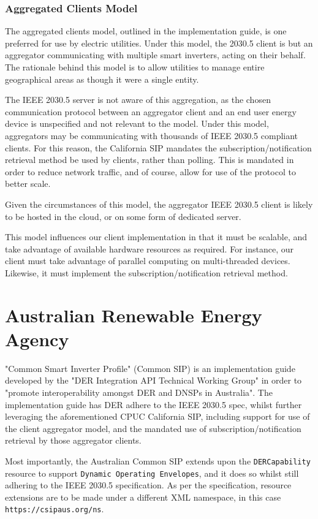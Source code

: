 \subsubsection{Aggregated Clients Model}
The aggregated clients model, outlined in the implementation guide, is one preferred for use by electric utilities. Under this model, the 2030.5 client is but an aggregator communicating with multiple smart inverters, acting on their behalf.
The rationale behind this model is to allow utilities to manage entire geographical areas as though it were a single entity.



The IEEE 2030.5 server is not aware of this aggregation, as the chosen communication protocol between an aggregator client and an end user energy device is unspecified and not relevant to the model.
Under this model, aggregators may be communicating with thousands of IEEE 2030.5 compliant clients. For this reason, the California SIP mandates the subscription/notification retrieval method be used by clients, rather than polling.
This is mandated in order to reduce network traffic, and of course, allow for use of the protocol to better scale.

Given the circumstances of this model, the aggregator IEEE 2030.5 client is likely to be hosted in the cloud, or on some form of dedicated server.

This model influences our client implementation in that it must be scalable, and take advantage of available hardware resources as required. For instance, our client must take advantage of parallel computing on multi-threaded devices.
Likewise, it must implement the subscription/notification retrieval method.


\section{Australian Renewable Energy Agency}
"Common Smart Inverter Profile" (Common SIP) is an implementation guide developed by the "DER Integration API Technical Working Group" in order to "promote interoperability amongst DER and DNSPs in Australia".
The implementation guide has DER adhere to the IEEE 2030.5 spec, whilst further leveraging the aforementioned CPUC California SIP, including support for use of the client aggregator model, and the mandated use of subscription/notification retrieval by those aggregator clients.

Most importantly, the Australian Common SIP extends upon the \texttt{DERCapability} resource to support \texttt{Dynamic Operating Envelopes}, and it does so whilst still adhering to the IEEE 2030.5 specification.
As per the specification, resource extensions are to be made under a different XML namespace, in this case \texttt{https://csipaus.org/ns}. \cite[]{CSIPAus}

